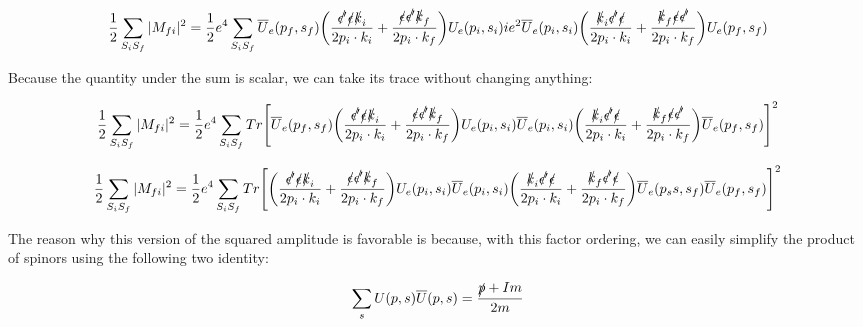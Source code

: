 \documentclass[a4]{article}
\begin{document}
    \begin{equation}
        \frac{1}{2} \sum_{S_i S_f} |M_{fi}|^2 = \frac{1}{2} e^4 \sum_{S_i S_f} \overline{U}_e (p_f, s_f) \bigg(\frac{\slashed{\epsilon'} \slashed{\epsilon} \slashed{k}_i}{2 p_i \cdot k_i} + \frac{\slashed{\epsilon} \slashed{\epsilon'} \slashed{k}_f}{2 p_i \cdot k_f} \bigg) U_e (p_i, s_i) i e^2 \overline{U}_e (p_i, s_i) \bigg(\frac{\slashed{k}_i \slashed{\epsilon'} \slashed{\epsilon}}{2 p_i \cdot k_i} + \frac{\slashed{k}_f \slashed{\epsilon} \slashed{\epsilon'}}{2 p_i \cdot k_f} \bigg) U_e (p_f, s_f)
    \end{equation}

    Because the quantity under the sum is scalar, we can take its trace without changing anything:

    \begin{equation}
        \frac{1}{2} \sum_{S_i S_f} |M_{fi}|^2 = \frac{1}{2} e^4 \sum_{S_i S_f} Tr \Bigg[ \overline{U}_e (p_f, s_f) \bigg(\frac{\slashed{\epsilon'} \slashed{\epsilon} \slashed{k}_i}{2 p_i \cdot k_i} + \frac{\slashed{\epsilon} \slashed{\epsilon'} \slashed{k}_f}{2 p_i \cdot k_f} \bigg) U_e (p_i, s_i) \overline{U}_e (p_i, s_i) \bigg(\frac{\slashed{k}_i \slashed{\epsilon'} \slashed{\epsilon}}{2 p_i \cdot k_i} + \frac{\slashed{k}_f \slashed{\epsilon} \slashed{\epsilon'}}{2 p_i \cdot k_f} \bigg) \overline{U}_e (p_f, s_f) \Bigg]^2
    \end{equation}

    \begin{equation}
        \frac{1}{2} \sum_{S_i S_f} |M_{fi}|^2 = \frac{1}{2} e^4 \sum_{S_i S_f} Tr \Bigg[ \bigg(\frac{\slashed{\epsilon'} \slashed{\epsilon} \slashed{k}_i}{2 p_i \cdot k_i} + \frac{\slashed{\epsilon} \slashed{\epsilon'} \slashed{k}_f}{2 p_i \cdot k_f} \bigg) U_e (p_i, s_i) \overline{U}_e (p_i, s_i) \bigg(\frac{\slashed{k}_i \slashed{\epsilon'} \slashed{\epsilon}}{2 p_i \cdot k_i} + \frac{\slashed{k}_f \slashed{\epsilon'} \slashed{\epsilon}}{2 p_i \cdot k_f} \bigg) \overline{U}_e (p_ss, s_f) \overline{U}_e (p_f, s_f) \Bigg]^2
    \end{equation}

    The reason why this version of the squared amplitude is favorable is because, with this factor ordering, we can easily simplify the product of spinors using the following two identity:

    \begin{equation}
        \sum_{s} U (p, s) \overline{U} (p, s) = \frac{\slashed{p} + I m}{2 m}
    \end{equation}
\end{document}
